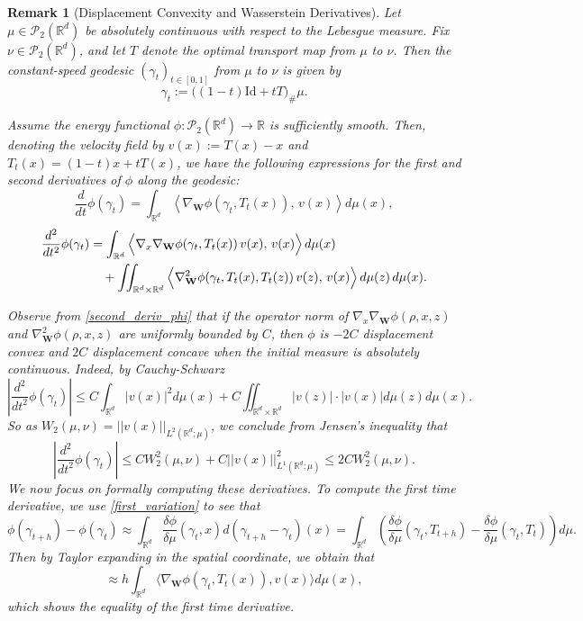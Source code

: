 \documentclass[11pt,a4paper]{amsart}
\newcommand{\1}{\mathds{1}}
\newcommand{\R}{{\mathbb R}}
\newtheorem{remark}[theorem]{\textbf{Remark}}
\numberwithin{equation}{section}
\begin{document}
\begin{remark}[Displacement Convexity and Wasserstein Derivatives] \label{Hessian_displacement}
Let $\mu \in \mathcal{P}_2(\R^d)$ be absolutely continuous with respect to the Lebesgue measure.  
Fix $\nu \in \mathcal{P}_2(\R^d)$, and let $T$ denote the optimal transport map from $\mu$ to $\nu$.  Then the constant-speed geodesic $(\gamma_t)_{t \in [0,1]}$ from $\mu$ to $\nu$ is given by
\[
\gamma_t := \big((1-t)\mathrm{Id} + tT\big)_{\#} \mu.
\]

Assume the energy functional $\phi : \mathcal{P}_2(\R^d) \to \R$ is sufficiently smooth.  Then, denoting the velocity field by $v(x) := T(x) - x$ and $T_t(x) = (1-t)x+ tT(x)$, we have the following expressions for the first and second derivatives of $\phi$ along the geodesic:
\begin{equation}
\frac{d}{dt} \phi(\gamma_t) 
= \int_{\R^d} \left\langle \nabla_{\mathbf{W}} \phi(\gamma_t, T_t(x)),\, v(x) \right\rangle  d\mu(x), \label{first_deriv_phi}
\end{equation}
\begin{align}
\frac{d^2}{dt^2} \phi(\gamma_t)
&= \int_{\R^d}
\Big\langle
\nabla_x \nabla_{\mathbf{W}} \phi(\gamma_t, T_t(x))\, v(x),
\, v(x)
\Big\rangle
\, d\mu(x) \notag \\
&\quad
+ \iint_{\R^d \times \R^d}
\Big\langle
\nabla_{\mathbf{W}}^2 \phi(\gamma_t, T_t(x), T_t(z))\, v(z),
\, v(x)
\Big\rangle
\, d\mu(z)\, d\mu(x).
\label{second_deriv_phi}
\end{align}


Observe from \eqref{second_deriv_phi} that if the operator norm of $\nabla_x \nabla_{\mathbf{W}} \phi(\rho,x,z)$ and $\nabla^2_{\mathbf{W}} \phi(\rho,x,z)$ are uniformly bounded by $C$, then $\phi$ is $-2C$ displacement convex and $2C$ displacement concave when the initial measure is absolutely continuous. Indeed, by Cauchy-Schwarz
\[ \left| \frac{d^2}{dt^2} \phi(\gamma_t) \right| \leq  C \int_{\R^d} |v(x)|^2 d\mu(x) + C \iint_{\R^d \times \R^d} |v(z)| \cdot |v(x)| d\mu(z)d\mu(x).  \] So as $W_2(\mu,\nu) = ||v(x)||_{L^2(\R^d;\mu)}$, we conclude from Jensen's inequality that
\[  \left| \frac{d^2}{dt^2} \phi(\gamma_t) \right| \leq  C W_2^2(\mu,\nu) + C ||v(x)||_{L^1(\R^d;\mu)}^2 \leq 2C W_2^2(\mu,\nu).  \] 
We now focus on formally computing these derivatives. To compute the first time derivative, we use \eqref{first_variation} to see that
\[ \phi(\gamma_{t+h}) - \phi(\gamma_t) \approx \int_{\R^d} \frac{\delta \phi}{\delta \mu}( \gamma_t,x) d(\gamma_{t+h}-\gamma_t)(x) = \int_{\R^d} \left( \frac{\delta \phi}{\delta \mu}(\gamma_t, T_{t+h}) - \frac{\delta \phi}{\delta \mu}(\gamma_t,T_t) \right) d\mu.  \] Then by Taylor expanding in the spatial coordinate, we obtain that
\[ \approx h\int_{\R^d} \langle \nabla_{\mathbf{W}}  \phi(\gamma_t,T_t(x)), v(x) \rangle d\mu(x),   \] which shows the equality of the first time derivative. \smallskip


\end{remark}
\end{document}
